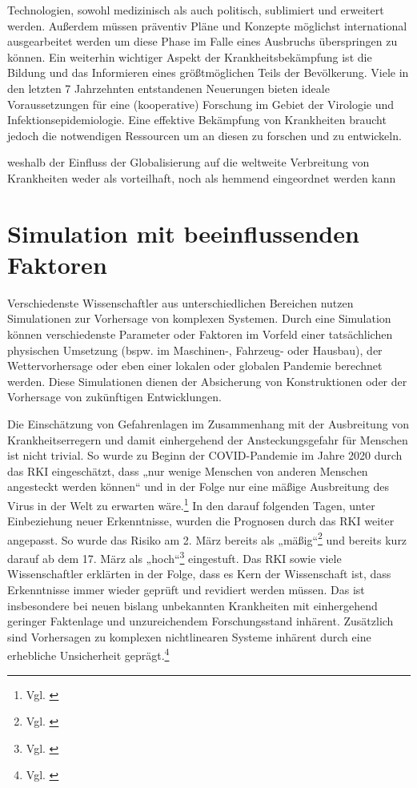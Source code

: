 \documentclass[12pt]{article}
\begin{document}
Technologien, sowohl medizinisch als auch politisch, sublimiert und erweitert werden. Außerdem müssen präventiv Pläne und Konzepte möglichst international ausgearbeitet werden um diese Phase im Falle eines Ausbruchs überspringen zu können. Ein weiterhin wichtiger Aspekt der Krankheitsbekämpfung ist die Bildung und das Informieren eines größtmöglichen Teils der Bevölkerung. Viele in den letzten 7 Jahrzehnten entstandenen Neuerungen bieten ideale Voraussetzungen für eine (kooperative) Forschung im Gebiet der Virologie und Infektionsepidemiologie. Eine effektive Bekämpfung von Krankheiten braucht jedoch die notwendigen Ressourcen um an diesen zu forschen und zu entwickeln. 

weshalb der Einfluss der Globalisierung auf die weltweite Verbreitung von Krankheiten weder als vorteilhaft, noch als hemmend eingeordnet werden kann
\section{Simulation mit beeinflussenden Faktoren}
Verschiedenste Wissenschaftler aus unterschiedlichen Bereichen nutzen Simulationen zur Vorhersage von komplexen Systemen. Durch eine Simulation können verschiedenste Parameter oder Faktoren im Vorfeld einer tatsächlichen physischen Umsetzung (bspw. im Maschinen-, Fahrzeug- oder Hausbau), der Wettervorhersage oder eben einer lokalen oder globalen Pandemie berechnet werden. Diese Simulationen dienen der Absicherung von Konstruktionen oder der Vorhersage von zukünftigen Entwicklungen.

Die Einschätzung von Gefahrenlagen im Zusammenhang mit der Ausbreitung von Krankheitserregern und damit einhergehend der Ansteckungsgefahr für Menschen ist nicht trivial. So wurde zu Beginn der COVID-Pandemie im Jahre 2020 durch das RKI eingeschätzt, dass „nur wenige Menschen von anderen Menschen angesteckt werden können“ und in der Folge nur eine mäßige Ausbreitung des Virus in der Welt zu erwarten wäre.\footnote{Vgl. \cite{MerkurRKI}} In den darauf folgenden Tagen, unter Einbeziehung neuer Erkenntnisse, wurden die Prognosen durch das RKI weiter angepasst. So wurde das Risiko am 2. März bereits als „mäßig“\footnote{Vgl. \cite{ARDMedia01}} und bereits kurz darauf ab dem 17. März als „hoch“\footnote{Vgl. \cite{RKIhoch}} eingestuft. Das RKI sowie viele Wissenschaftler erklärten in der Folge, dass es Kern der Wissenschaft ist, dass Erkenntnisse immer wieder geprüft und revidiert werden müssen. Das ist insbesondere bei neuen bislang unbekannten Krankheiten mit einhergehend geringer Faktenlage und unzureichendem Forschungsstand inhärent. Zusätzlich sind Vorhersagen zu komplexen nichtlinearen Systeme inhärent durch eine erhebliche Unsicherheit geprägt.\footnote{Vgl. \cite{ZDFWissenschaft}}
\end{document}
